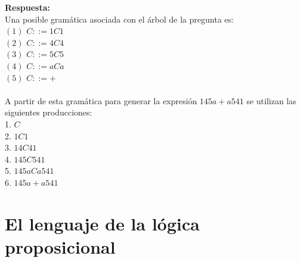 \documentclass{article}
\begin{document}
\begin{enumerate}
	
\begin{center}	
\end{center}

\large{\textbf{Respuesta:}} \normalsize \\

Una posible gramática asociada con el árbol de la pregunta es: \\
	$(1)$ $C ::= 1C1$ \\
	$(2)$ $C ::= 4C4$ \\
	$(3)$ $C ::= 5C5$ \\
	$(4)$ $C ::= aCa$ \\
	$(5)$ $C ::= +$ \\
\\ A partir de esta gramática para generar la expresión $145a+a541$ se utilizan las siguientes producciones: \\
	1. $C$ \\
	2. $1C1$ \\ 
	3. $14C41$ \\
	4. $145C541$ \\
	5. $145aCa541$ \\
	6. $145a+a541$ \\


\section*{El lenguaje de la lógica proposicional}


\end{enumerate}
\end{document}
